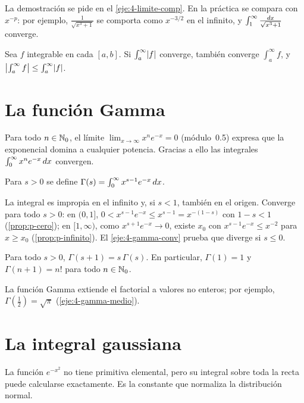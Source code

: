 La demostración se pide en el \cref{eje:4-limite-comp}. En la práctica se compara con $x^{-p}$: por ejemplo, $\frac{1}{\sqrt{x^{3}+1}}$ se comporta como $x^{-3/2}$ en el infinito, y $\int_1^{\infty}\frac{\mathop{}\!d x}{\sqrt{x^{3}+1}}$ converge.

\begin{teorema}\label{teo:absoluta-int}
Sea $f$ integrable en cada $[a,b]$. Si $\int_a^{\infty}\lvert f\rvert$ converge, también converge $\int_a^{\infty}f$, y $\bigl|\int_a^{\infty}f\bigr|\le\int_a^{\infty}\lvert f\rvert$.
\end{teorema}

\addtocounter{definicion}{1}%

\section{La función Gamma}

Para todo $n\in\mathbb{N}_0$, el límite $\lim_{x\to\infty}x^{n}e^{-x}=0$ (módulo~0.5) expresa que la exponencial domina a cualquier potencia. Gracias a ello las integrales $\int_0^{\infty}x^{n}e^{-x}\mathop{}\!d x$ convergen.

\begin{definicion}\label{def:gamma}
Para $s>0$ se define $\Gamma(s)=\int_0^{\infty}x^{s-1}e^{-x}\mathop{}\!d x$.
\end{definicion}

La integral es impropia en el infinito y, si $s<1$, también en el origen. Converge para todo $s>0$: en $(0,1]$, $0<x^{s-1}e^{-x}\le x^{s-1}=x^{-(1-s)}$ con $1-s<1$ (\cref{prop:p-cero}); en $[1,\infty)$, como $x^{s+1}e^{-x}\to0$, existe $x_0$ con $x^{s-1}e^{-x}\le x^{-2}$ para $x\ge x_0$ (\cref{prop:p-infinito}). El \cref{eje:4-gamma-conv} prueba que diverge si $s\le0$.

\begin{proposicion}\label{prop:gamma-factorial}
Para todo $s>0$, $\Gamma(s+1)=s\,\Gamma(s)$. En particular, $\Gamma(1)=1$ y $\Gamma(n+1)=n!$ para todo $n\in\mathbb{N}_0$.
\end{proposicion}

La función Gamma extiende el factorial a valores no enteros; por ejemplo, $\Gamma(\frac12)=\sqrt\pi$ (\cref{eje:4-gamma-medio}).

\section{La integral gaussiana}

La función $e^{-x^{2}}$ no tiene primitiva elemental, pero su integral sobre toda la recta puede calcularse exactamente. Es la constante que normaliza la distribución normal.

